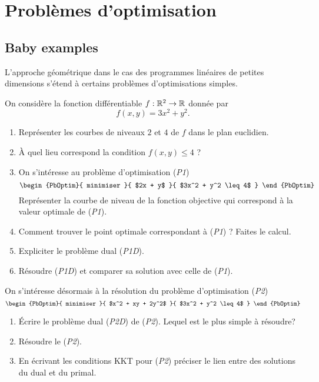 \documentclass[11pt, a4paper]{article}
\begin{document}
\section{Problèmes d'optimisation}

\subsection{Baby examples}

L'approche géométrique dans le cas des programmes linéaires de petites
dimensions s'étend à certains problèmes d'optimisations simples.

\begin{question}
On considère la fonction différentiable $f : \mathbb{R}^2 \to \mathbb{R}$ donnée par
\[
f(x, y) = 3x^2 + y^2.
\]
\begin{enumerate}
\item Représenter les courbes de niveaux $2$ et $4$ de $f$ dans le
  plan euclidien.
\item À quel lieu correspond la condition $f(x, y) \leq 4$ ?
\item On s'intéresse au problème d'optimisation (\emph{P1})
  \[
  \begin{PbOptim}{
      minimiser
    }{
      $2x + y$
    }{
      $3x^2 + y^2 \leq 4$
    }
  \end{PbOptim}
  \]
  Représenter la courbe de niveau de la fonction objective qui
  correspond à la valeur optimale de (\emph{P1}).
\item Comment trouver le point optimale correspondant à (\emph{P1}) ?
  Faites le calcul.
\item Expliciter le problème dual (\emph{P1D}).
\item Résoudre (\emph{P1D}) et comparer sa solution avec celle de
  (\emph{P1}).
\end{enumerate}
\end{question}

\noindent On s'intéresse désormais à la résolution du problème
d'optimisation (\emph{P2})
  \[
  \begin{PbOptim}{
      minimiser
    }{
      $x^2 + xy + 2y^2$
    }{
      $3x^2 + y^2 \leq 4$
    }
  \end{PbOptim}
  \]
  \begin{question}
    \begin{enumerate}
    \item Écrire le problème dual (\emph{P2D}) de (\emph{P2}). Lequel
      est le plus simple à résoudre?
    \item Résoudre le (\emph{P2}).
    \item En écrivant les conditions KKT pour (\emph{P2}) préciser le
      lien entre des solutions du dual et du primal.
    \end{enumerate}
\end{question}
\end{document}
